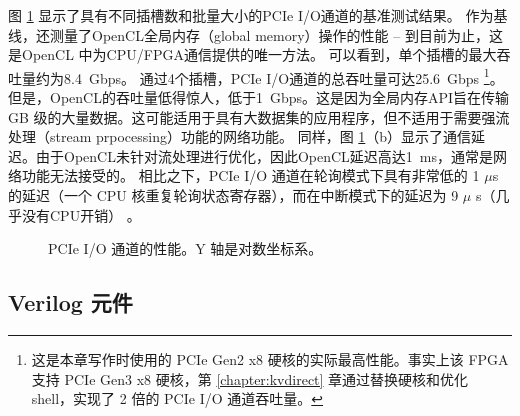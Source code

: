 图 \ref {clicknp:fig:pcie} 显示了具有不同插槽数和批量大小的PCIe I/O通道的基准测试结果。
作为基线，还测量了OpenCL全局内存（global memory）操作的性能 -- 到目前为止，这是OpenCL \cite {opencl} 中为CPU/FPGA通信提供的唯一方法。
可以看到，单个插槽的最大吞吐量约为8.4~Gbps。
通过4个插槽，PCIe I/O通道的总吞吐量可达25.6~Gbps \footnote{这是本章写作时使用的 PCIe Gen2 x8 硬核的实际最高性能。事实上该 FPGA 支持 PCIe Gen3 x8 硬核，第 \ref{chapter:kvdirect} 章通过替换硬核和优化 shell，实现了 2 倍的 PCIe I/O 通道吞吐量。}。
但是，OpenCL的吞吐量低得惊人，低于1~Gbps。这是因为全局内存API旨在传输 GB 级的大量数据。这可能适用于具有大数据集的应用程序，但不适用于需要强流处理（stream prpocessing）功能的网络功能。
同样，图 \ref {clicknp:fig:pcie}（b）显示了通信延迟。由于OpenCL未针对流处理进行优化，因此OpenCL延迟高达1~ms，通常是网络功能无法接受的。
相比之下，PCIe I/O 通道在轮询模式下具有非常低的 1 $\mu$s 的延迟（一个 CPU 核重复轮询状态寄存器），而在中断模式下的延迟为 9 $\mu$ s（几乎没有CPU开销） 。

\begin{figure}[htbp]
	\centering

	\caption{PCIe I/O 通道的性能。Y 轴是对数坐标系。}

	\label{clicknp:fig:pcie}
\end{figure}


\subsection{Verilog 元件}

